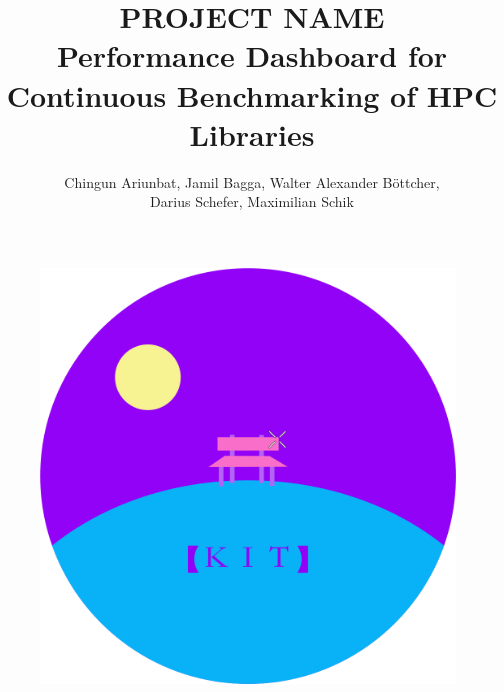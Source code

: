 \documentclass[parskip=full,11pt]{scrartcl}
\title{\Huge PROJECT NAME \\ 
    \LARGE \normalfont Performance Dashboard for Continuous Benchmarking of HPC Libraries}
\author{Chingun Ariunbat, Jamil Bagga, Walter Alexander B\"ottcher,\\Darius Schefer, Maximilian Schik}
\begin{document}
\maketitle
\begin{figure}[h]
	\includegraphics[width=11cm]{vapor.png}
	\centering	
\end{figure}

\clearpage

\tableofcontents
\clearpage


\clearpage


\clearpage


\clearpage


\clearpage


\clearpage


\clearpage


\clearpage


\clearpage


\clearpage


\clearpage

\appendix

\printnoidxglossaries
\end{document}
